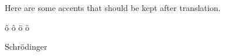 \documentclass{article}
\begin{document}
Here are some accents that should be kept after translation.

\^{o} \^o \"{o} \"o

Schr\"{o}dinger
\end{document}
